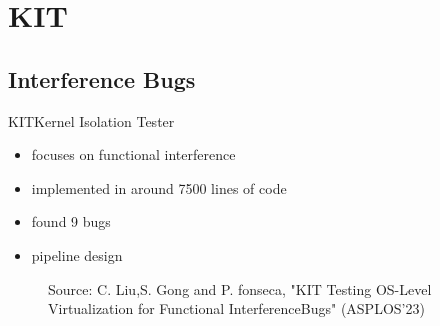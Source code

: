 \section{KIT}
\subsection{Interference Bugs}
\begin{frame}{KIT}{Kernel Isolation Tester}
\begin{itemize}
    \setlength\itemsep{1em}
    \item focuses on functional interference
    \item implemented in around 7500 lines of code 
    \item found 9 bugs
    \item pipeline design
\end{itemize}
\begin{figure}[hb]
    \centering
\def\stackalignment{l}
           {\scriptsize
            Source: C. Liu,S. Gong and P. fonseca, "KIT  Testing OS-Level Virtualization for Functional InterferenceBugs" (ASPLOS'23)}
    \end{figure}
\end{frame}